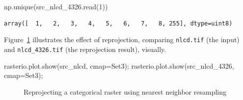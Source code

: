 \documentclass[
  letterpaper,
]{krantz}
\newenvironment{Shaded}{\begin{snugshade}}{\end{snugshade}}
\newcommand{\DecValTok}[1]{\textcolor[rgb]{0.68,0.00,0.00}{#1}}
\newcommand{\NormalTok}[1]{\textcolor[rgb]{0.00,0.23,0.31}{#1}}
\newcommand{\OperatorTok}[1]{\textcolor[rgb]{0.37,0.37,0.37}{#1}}
\newcommand{\StringTok}[1]{\textcolor[rgb]{0.13,0.47,0.30}{#1}}
\begin{document}
\begin{Shaded}
\begin{Highlighting}[]
\NormalTok{np.unique(src\_nlcd\_4326.read(}\DecValTok{1}\NormalTok{))}
\end{Highlighting}
\end{Shaded}

\begin{verbatim}
array([  1,   2,   3,   4,   5,   6,   7,   8, 255], dtype=uint8)
\end{verbatim}

Figure~\ref{fig-raster-reproject-nlcd} illustrates the effect of
reprojection, comparing \texttt{nlcd.tif} (the input) and
\texttt{nlcd\_4326.tif} (the reprojection result), visually.

\begin{Shaded}
\begin{Highlighting}[]
\NormalTok{rasterio.plot.show(src\_nlcd, cmap}\OperatorTok{=}\StringTok{\textquotesingle{}Set3\textquotesingle{}}\NormalTok{)}\OperatorTok{;}
\NormalTok{rasterio.plot.show(src\_nlcd\_4326, cmap}\OperatorTok{=}\StringTok{\textquotesingle{}Set3\textquotesingle{}}\NormalTok{)}\OperatorTok{;}
\end{Highlighting}
\end{Shaded}

\begin{figure}

\begin{minipage}{0.50\linewidth}



\end{minipage}%
%
\begin{minipage}{0.50\linewidth}



\end{minipage}%

\caption{\label{fig-raster-reproject-nlcd}Reprojecting a categorical
raster using nearest neighbor resampling}

\end{figure}%
\end{document}
